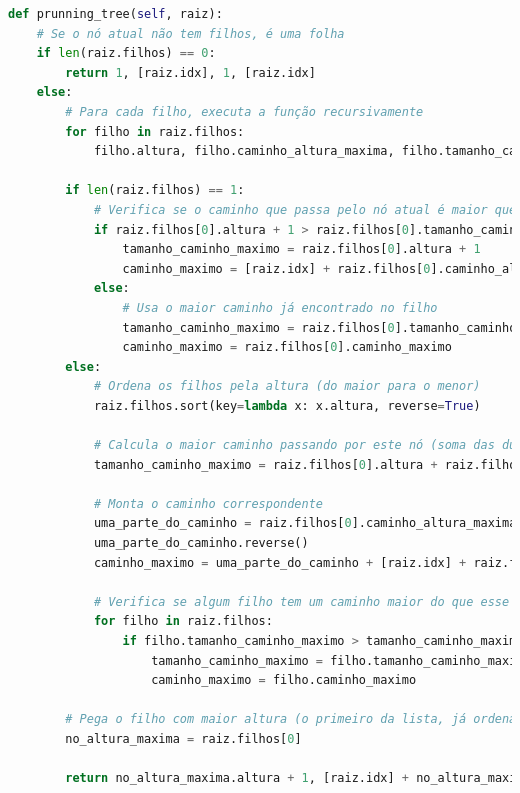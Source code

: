 \begin{lstlisting}[language=Python, caption={IMPLEMENTAÇÃO DO MÉTODO \texttt{prunning\_tree}.}, label={lst:prunning_tree}]
def prunning_tree(self, raiz):
    # Se o nó atual não tem filhos, é uma folha
    if len(raiz.filhos) == 0:
        return 1, [raiz.idx], 1, [raiz.idx]
    else:
        # Para cada filho, executa a função recursivamente
        for filho in raiz.filhos:
            filho.altura, filho.caminho_altura_maxima, filho.tamanho_caminho_maximo, filho.caminho_maximo = self.prunning_tree(filho)

        if len(raiz.filhos) == 1:
            # Verifica se o caminho que passa pelo nó atual é maior que o maior caminho encontrado até o momento
            if raiz.filhos[0].altura + 1 > raiz.filhos[0].tamanho_caminho_maximo:
                tamanho_caminho_maximo = raiz.filhos[0].altura + 1
                caminho_maximo = [raiz.idx] + raiz.filhos[0].caminho_altura_maxima
            else:
                # Usa o maior caminho já encontrado no filho
                tamanho_caminho_maximo = raiz.filhos[0].tamanho_caminho_maximo
                caminho_maximo = raiz.filhos[0].caminho_maximo
        else:
            # Ordena os filhos pela altura (do maior para o menor)
            raiz.filhos.sort(key=lambda x: x.altura, reverse=True)

            # Calcula o maior caminho passando por este nó (soma das duas maiores alturas + o nó atual)
            tamanho_caminho_maximo = raiz.filhos[0].altura + raiz.filhos[1].altura + 1

            # Monta o caminho correspondente
            uma_parte_do_caminho = raiz.filhos[0].caminho_altura_maxima.copy()
            uma_parte_do_caminho.reverse()
            caminho_maximo = uma_parte_do_caminho + [raiz.idx] + raiz.filhos[1].caminho_altura_maxima

            # Verifica se algum filho tem um caminho maior do que esse
            for filho in raiz.filhos:
                if filho.tamanho_caminho_maximo > tamanho_caminho_maximo:
                    tamanho_caminho_maximo = filho.tamanho_caminho_maximo
                    caminho_maximo = filho.caminho_maximo

        # Pega o filho com maior altura (o primeiro da lista, já ordenada)
        no_altura_maxima = raiz.filhos[0]

        return no_altura_maxima.altura + 1, [raiz.idx] + no_altura_maxima.caminho_altura_maxima, tamanho_caminho_maximo, caminho_maximo

\end{lstlisting}

